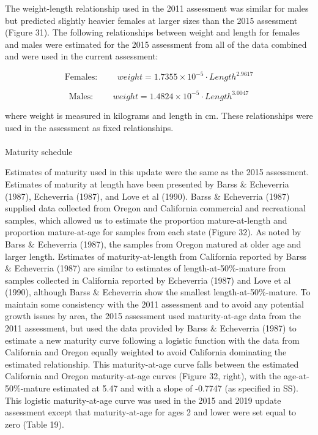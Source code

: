 \documentclass[
]{scrartcl}
\makeatletter
\let\oldparagraph\paragraph
\renewcommand{\paragraph}{
    \@ifstar
      \xxxParagraphStar
      \xxxParagraphNoStar
  }
\newcommand{\xxxParagraphStar}[1]{\oldparagraph*{#1}\mbox{}}
\newcommand{\xxxParagraphNoStar}[1]{\oldparagraph{#1}\mbox{}}
\makeatother
\begin{document}
The weight-length relationship used in the 2011 assessment was similar
for males but predicted slightly heavier females at larger sizes than
the 2015 assessment (Figure 31). The following relationships between
weight and length for females and males were estimated for the 2015
assessment from all of the data combined and were used in the current
assessment:

\[
\text{Females: } \qquad weight = 1.7355 \times 10^{-5} \cdot Length^{2.9617}
\]

\[
\text{Males: } \qquad weight = 1.4824 \times 10^{-5} \cdot Length^{3.0047}
\]

where weight is measured in kilograms and length in cm. These
relationships were used in the assessment as fixed relationships.

\paragraph{Maturity schedule}\label{maturity-schedule}

Estimates of maturity used in this update were the same as the 2015
assessment. Estimates of maturity at length have been presented by Barss
\& Echeverria (1987), Echeverria (1987), and Love et al (1990). Barss \&
Echeverria (1987) supplied data collected from Oregon and California
commercial and recreational samples, which allowed us to estimate the
proportion mature-at-length and proportion mature-at-age for samples
from each state (Figure 32). As noted by Barss \& Echeverria (1987), the
samples from Oregon matured at older age and larger length. Estimates of
maturity-at-length from California reported by Barss \& Echeverria
(1987) are similar to estimates of length-at-50\%-mature from samples
collected in California reported by Echeverria (1987) and Love et al
(1990), although Barss \& Echeverria show the smallest
length-at-50\%-mature. To maintain some consistency with the 2011
assessment and to avoid any potential growth issues by area, the 2015
assessment used maturity-at-age data from the 2011 assessment, but used
the data provided by Barss \& Echeverria (1987) to estimate a new
maturity curve following a logistic function with the data from
California and Oregon equally weighted to avoid California dominating
the estimated relationship. This maturity-at-age curve falls between the
estimated California and Oregon maturity-at-age curves (Figure 32,
right), with the age-at-50\%-mature estimated at 5.47 and with a slope
of -0.7747 (as specified in SS). This logistic maturity-at-age curve was
used in the 2015 and 2019 update assessment except that maturity-at-age
for ages 2 and lower were set equal to zero (Table 19).
\end{document}
